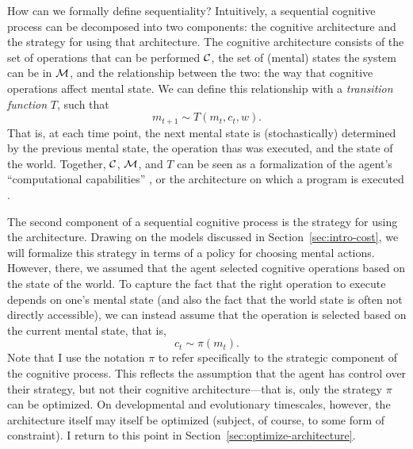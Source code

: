 How can we formally define sequentiality? Intuitively, a sequential cognitive process can be decomposed into two components: the cognitive architecture and the strategy for using that architecture. The cognitive architecture consists of the set of operations that can be performed $\mathcal{C}$, the set of (mental) states the system can be in $\mathcal{M}$, and the relationship between the two: the way that cognitive operations affect mental state. We can define this relationship with a \emph{transition function} $T$, such that
\begin{equation}
  m_{t+1} \sim T(m_t, c_t, w).
\end{equation}
That is, at each time point, the next mental state is (stochastically) determined by the previous mental state, the operation thas was executed, and the state of the world. Together, $\mathcal{C}$, $\mathcal{M}$, and $T$ can be seen as a formalization of the agent's ``computational capabilities'' \citep{simon1955behavioral}, or the architecture on which a program is executed \citep{russell1995provably}.

The second component of a sequential cognitive process is the strategy for using the architecture. Drawing on the models discussed in Section~\ref{sec:intro-cost}, we will formalize this strategy in terms of a policy for choosing mental actions. However, there, we assumed that the agent selected cognitive operations based on the state of the world. To capture the fact that the right operation to execute depends on one's mental state (and also the fact that the world state is often not directly accessible), we can instead assume that the operation is selected based on the current mental state, that is,
\begin{equation}\label{eq:intro-sequential}
   c_t \sim \pi(m_t).
\end{equation}
Note that I use the notation $\pi$ to refer specifically to the strategic component of the cognitive process. This reflects the assumption that the agent has control over their strategy, but not their cognitive architecture---that is, only the strategy $\pi$ can be optimized. On developmental and evolutionary timescales, however, the architecture itself may itself be optimized (subject, of course, to some form of constraint). I return to this point in Section~\ref{sec:optimize-architecture}.

